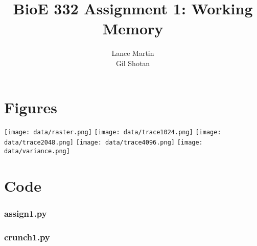 \documentclass[10pt]{article}
\begin{document}
\title{BioE 332 Assignment 1: Working Memory}
\author{Lance Martin \\ Gil Shotan}

\maketitle

%
%

\section*{Figures}
\begin{center}
\texttt{[image: data/raster.png]}
\texttt{[image: data/trace1024.png]}
\texttt{[image: data/trace2048.png]}
\texttt{[image: data/trace4096.png]}
\texttt{[image: data/variance.png]}
\end{center}
\section*{Code}

\subsubsection*{assign1.py}


\subsubsection*{crunch1.py}

\end{document}
